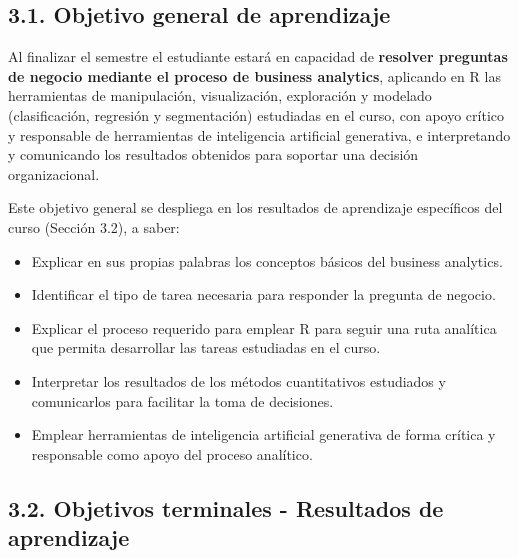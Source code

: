 \documentclass[11pt,a4paper]{article}
\begin{document}
\subsection*{3.1. Objetivo general de aprendizaje}

Al finalizar el semestre el estudiante estará en capacidad de \textbf{resolver preguntas de negocio mediante el proceso de business analytics}, aplicando en R las herramientas de manipulación, visualización, exploración y modelado (clasificación, regresión y segmentación) estudiadas en el curso, con apoyo crítico y responsable de herramientas de inteligencia artificial generativa, e interpretando y comunicando los resultados obtenidos para soportar una decisión organizacional.

\vspace{0.3cm}

Este objetivo general se despliega en los resultados de aprendizaje específicos del curso (Sección 3.2), a saber:

\begin{itemize}
    \item Explicar en sus propias palabras los conceptos básicos del business analytics.
    \item Identificar el tipo de tarea necesaria para responder la pregunta de negocio.
    \item Explicar el proceso requerido para emplear R para seguir una ruta analítica que permita desarrollar las tareas estudiadas en el curso.
    \item Interpretar los resultados de los métodos cuantitativos estudiados y comunicarlos para facilitar la toma de decisiones.
    \item Emplear herramientas de inteligencia artificial generativa de forma crítica y responsable como apoyo del proceso analítico.
\end{itemize}

\subsection*{3.2. Objetivos terminales - Resultados de aprendizaje}
\end{document}

